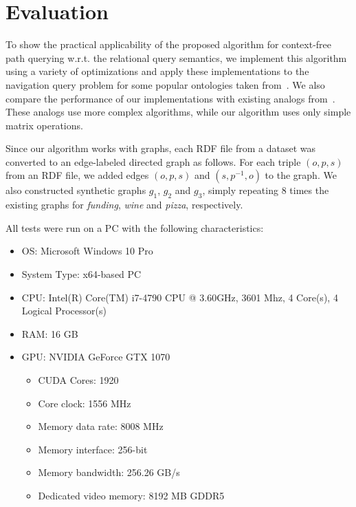 \section{Evaluation}
To show the practical applicability of the proposed algorithm for context-free path querying w.r.t. the relational query semantics, we implement this algorithm using a variety of optimizations and apply these implementations to the navigation query problem for some popular ontologies taken from~\cite{RDF}. We also compare the performance of our implementations with existing analogs from~\cite{GLL,RDF}. These analogs use more complex algorithms, while our algorithm uses only simple matrix operations.

Since our algorithm works with graphs, each RDF file from a dataset was converted to an edge-labeled directed graph as follows. For each triple $(o,p,s)$ from an RDF file, we added edges $(o,p,s)$ and $(s,p^{-1},o)$ to the graph. We also constructed synthetic graphs $g_1$, $g_2$ and $g_3$, simply repeating $8$ times the existing graphs for \textit{funding}, \textit{wine} and \textit{pizza}, respectively.

All tests were run on a PC with the following characteristics:
\begin{itemize}
    \item OS: Microsoft Windows 10 Pro
    \item System Type: x64-based PC
    \item CPU: Intel(R) Core(TM) i7-4790 CPU @ 3.60GHz, 3601 Mhz, 4 Core(s), 4 Logical Processor(s)
    \item RAM: 16 GB
    \item GPU: NVIDIA GeForce GTX 1070
    \begin{itemize}
        \item CUDA Cores:		1920 
        \item Core clock:		1556 MHz 
        \item Memory data rate:	8008 MHz
        \item Memory interface:	256-bit 
        \item Memory bandwidth:	256.26 GB/s
        \item Dedicated video memory:	8192 MB GDDR5
    \end{itemize}
\end{itemize}

